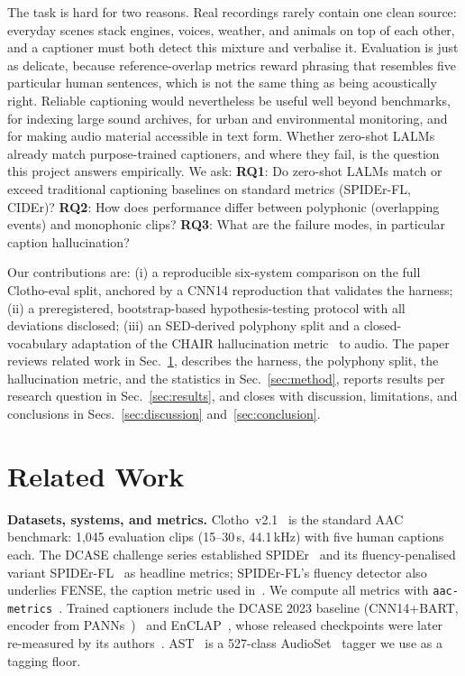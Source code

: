 \documentclass[conference]{IEEEtran}
\begin{document}
The task is hard for two reasons. Real recordings rarely contain one clean
source: everyday scenes stack engines, voices, weather, and animals on top of
each other, and a captioner must both detect this mixture and verbalise it.
Evaluation is just as delicate, because reference-overlap metrics reward
phrasing that resembles five particular human sentences, which is not the same
thing as being acoustically right. Reliable captioning would nevertheless be
useful well beyond benchmarks, for indexing large sound archives, for urban and
environmental monitoring, and for making audio material accessible in text
form. Whether zero-shot LALMs already match
purpose-trained captioners, and where they fail, is the question this
project answers empirically. We ask:
\textbf{RQ1}: Do zero-shot LALMs match or exceed traditional captioning
baselines on standard metrics (SPIDEr-FL, CIDEr)?
\textbf{RQ2}: How does performance differ between polyphonic (overlapping
events) and monophonic clips?
\textbf{RQ3}: What are the failure modes, in particular caption hallucination?

Our contributions are: (i) a reproducible six-system comparison on the full
Clotho-eval split, anchored by a CNN14 reproduction that validates the harness;
(ii) a preregistered, bootstrap-based hypothesis-testing protocol with all
deviations disclosed; (iii) an SED-derived polyphony split and a
closed-vocabulary adaptation of the CHAIR hallucination
metric~\cite{rohrbach2018chair} to audio.
The paper reviews related work in Sec.~\ref{sec:related}, describes the
harness, the polyphony split, the hallucination metric, and the statistics in
Sec.~\ref{sec:method}, reports results per research question in
Sec.~\ref{sec:results}, and closes with discussion, limitations, and
conclusions in Secs.~\ref{sec:discussion} and~\ref{sec:conclusion}.

\section{Related Work}\label{sec:related}
\textbf{Datasets, systems, and metrics.}
Clotho~v2.1~\cite{drossos2020clotho} is the standard AAC benchmark: 1{,}045
evaluation clips (15--30\,s, 44.1\,kHz) with five human captions each. The
DCASE challenge series established SPIDEr~\cite{liu2017spider} and its
fluency-penalised variant SPIDEr-FL~\cite{zhou2022fense} as headline metrics;
SPIDEr-FL's fluency detector also underlies FENSE, the caption metric used
in~\cite{harish2025dcase}. We compute all metrics with
\texttt{aac-metrics}~\cite{labbe_aacmetrics}.
Trained captioners include the DCASE 2023 baseline (CNN14+BART, encoder from
PANNs~\cite{kong2020panns})~\cite{dcase2023task6a} and
EnCLAP~\cite{kim2024enclap}, whose released checkpoints were later re-measured
by its authors~\cite{kim2024enclappp}. AST~\cite{gong2021ast} is a 527-class
AudioSet~\cite{gemmeke2017audioset} tagger we use as a tagging floor.
\end{document}
